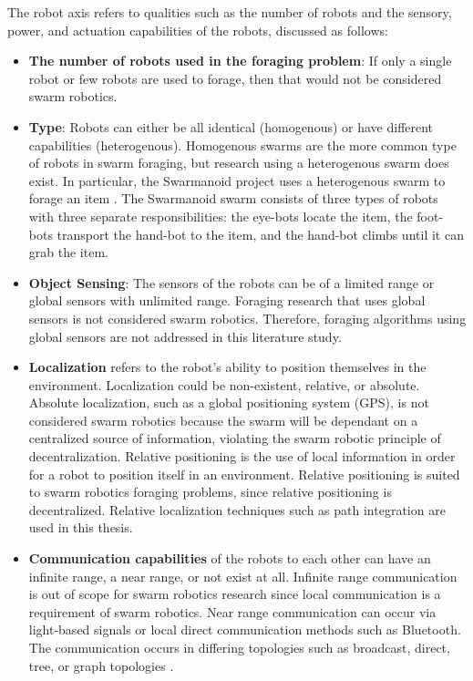 The robot axis refers to qualities such as the number of robots and the sensory, power, and actuation capabilities of the robots, discussed as follows:

\begin{itemize}
\item \textbf{The number of robots used in the foraging problem}: If only a single robot or few robots are used to forage, then that would not be considered swarm robotics.

\item \textbf{Type}: Robots can either be all identical (homogenous) or have different capabilities (heterogenous). Homogenous swarms are the more common type of robots in swarm foraging, but research using a heterogenous swarm does exist. In particular, the Swarmanoid project uses a heterogenous swarm to forage an item \cite{dorigo2013swarmanoid}. The Swarmanoid swarm consists of three types of robots with three separate responsibilities: the eye-bots locate the item, the foot-bots transport the hand-bot to the item, and the hand-bot climbs until it can grab the item. 

\item \textbf{Object Sensing}: The sensors of the robots can be of a limited range or global sensors with unlimited range. Foraging research that uses global sensors is not considered swarm robotics. Therefore, foraging algorithms using global sensors are not addressed in this literature study.

\item \textbf{Localization} refers to the robot's ability to position themselves in the environment. Localization could be non-existent, relative, or absolute. Absolute localization, such as a global positioning system (GPS), is not considered swarm robotics because the swarm will be dependant on a centralized source of information, violating the swarm robotic principle of decentralization. Relative positioning is the use of local information in order for a robot to position itself in an environment. Relative positioning is suited to swarm robotics foraging problems, since relative positioning is decentralized. Relative localization techniques such as path integration are used in this thesis.

\item \textbf{Communication capabilities} of the robots to each other can have an infinite range, a near range, or not exist at all. Infinite range communication is out of scope for swarm robotics research since local communication is a requirement of swarm robotics. Near range communication can occur via light-based signals \cite{sugawara2002swarming} or local direct communication methods such as Bluetooth. The communication occurs in differing topologies such as broadcast, direct, tree, or graph topologies \cite{dudek1993taxonomy}.


\end{itemize}
